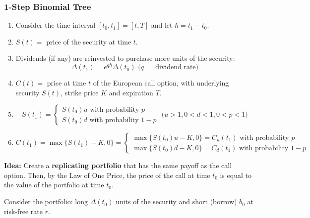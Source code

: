 \subsubsection{1-Step Binomial Tree}
\begin{enumerate}
    \item Consider the time interval \([t_0, t_1] = [t, T]\) and let \(h = t_1 - t_0\).

    \item \(S(t) = \) price of the security at time \(t\).

    \item Dividends (if any) are reinvested to purchase more units of the security:
    \begin{equation*}
        \Delta(t_1) = e^{qh} \Delta(t_0) \text{ (} q= \text{ dividend rate})
    \end{equation*}

    \item \(C(t) = \) price at time \(t\) of the European call option, with underlying security \(S(t)\), strike price \(K\) and expiration \(T\).

    \item
    \begin{equation*}
        S(t_1) = \begin{cases}
            S(t_0)u \text{ with probability } p \\
            S(t_0)d \text{ with probability } 1-p
        \end{cases} \text{ (} u > 1, 0 < d < 1, 0 < p < 1 \text{)}
    \end{equation*}

    \item
    \begin{equation*}
        C(t_1) = \max\{S(t_1)-K, 0\} = \begin{cases}
            \max\{S(t_0)u - K, 0\} = C_u(t_1) \text{ with probability } p \\
            \max\{S(t_0)d - K, 0\} = C_d(t_1) \text{ with probability } 1-p
        \end{cases}
    \end{equation*}
\end{enumerate}

\textbf{Idea: } Create a \textbf{replicating portfolio} that has the same payoff as the call option. Then, by the Law of One Price, the price of the call at time \(t_0\) is equal to the value of the portfolio at time \(t_0\).

Consider the portfolio: long \(\Delta(t_0)\) units of the security and short (borrow) \(b_0\) at risk-free rate \(r\).

